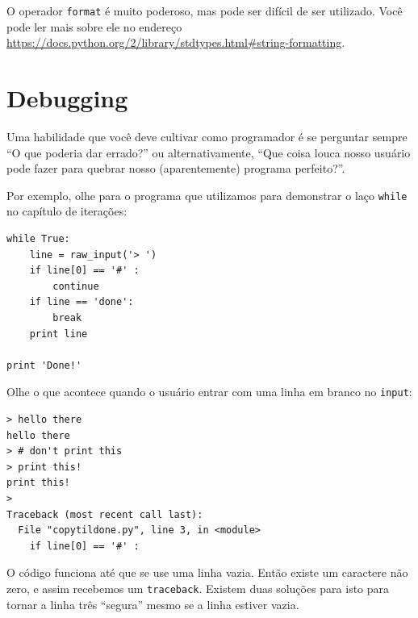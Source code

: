 {O operador {\tt format} é muito poderoso, mas pode ser difícil de ser
utilizado. Você pode ler mais sobre ele no endereço
\url{https://docs.python.org/2/library/stdtypes.html#string-formatting}.




\section{Debugging}


Uma habilidade que você deve cultivar como programador é se perguntar sempre
``O que poderia dar errado?'' ou alternativamente, ``Que coisa louca nosso
usuário pode fazer para quebrar nosso (aparentemente) programa perfeito?''.


Por exemplo, olhe para o programa que utilizamos para demonstrar o laço
{\tt while} no capítulo de iterações:

\beforeverb
\begin{verbatim}
while True:
    line = raw_input('> ')
    if line[0] == '#' :
        continue
    if line == 'done':
        break
    print line

print 'Done!'
\end{verbatim}
\afterverb
%
%
Olhe o que acontece quando o usuário entrar com uma linha em branco no
{\tt input}:
\beforeverb
\begin{verbatim}
> hello there
hello there
> # don't print this
> print this!
print this!
>
Traceback (most recent call last):
  File "copytildone.py", line 3, in <module>
    if line[0] == '#' :
\end{verbatim}
\afterverb
%
%
O código funciona até que se use uma linha vazia. Então existe um caractere
não zero, e assim recebemos um {\tt traceback}. Existem duas soluções para isto
para tornar a linha três ``segura'' mesmo se a linha estiver vazia.

}
